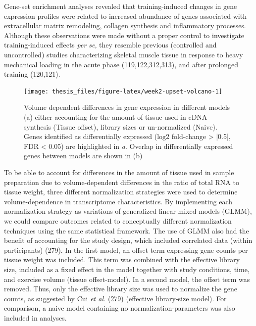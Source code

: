 \documentclass[twoside,10pt]{gihclass} %
\begin{document}
Gene-set enrichment analyses revealed that training-induced changes in gene expression profiles were related to increased abundance of genes associated with extracellular matrix remodeling, collagen synthesis and inflammatory processes. Although these observations were made without a proper control to investigate training-induced effects \emph{per se}, they resemble previous (controlled and uncontrolled) studies characterizing skeletal muscle tissue in response to heavy mechanical loading in the acute phase
(119,122,312,313),
and after prolonged training (120,121).
\begin{figure}

{\centering \texttt{[image: thesis\_files/figure-latex/week2-upset-volcano-1]} 

}

\caption[General patterns of differentially expressed genes at Week 2]{Volume dependent differences in gene expression in different models (a) either accounting for the amount of tissue used in cDNA synthesis (Tissue offset), library sizes or un-normalized (Naive). Genes identified as differentially expressed (log2 fold-change > |0.5|, FDR < 0.05) are highlighted in \textit{a}.  Overlap in differentially expressed genes between models are shown in (b)}\label{fig:week2-upset-volcano}
\end{figure}
To be able to account for differences in the amount of tissue used in sample preparation due to volume-dependent differences in the ratio of total RNA to tissue weight, three different normalization strategies were used to determine volume-dependence in transcriptome characteristics.
By implementing each normalization strategy as variations of generalized linear mixed models (GLMM), we could compare outcomes related to conceptually different normalization techniques using the same statistical framework.
The use of GLMM also had the benefit of accounting for the study design, which included correlated data (within participants)
(279).
In the first model, an offset term expressing gene counts per tissue weight was included. This term was combined with the effective library size, included as a fixed effect in the model together with study conditions, time, and exercise volume (tissue offset-model).
In a second model, the offset term was removed. Thus, only the effective library size was used to normalize the gene counts, as suggested by Cui \emph{et al.}
(279) (effective library-size model).
For comparison, a naive model containing no normalization-parameters was also included in analyses.
\end{document}
